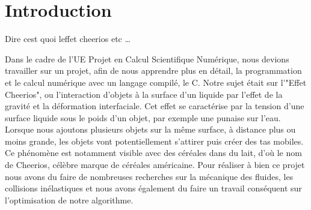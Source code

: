 \documentclass[a4paper, 11pt, oneside]{article} %
\begin{document}
 

\newpage
\section*{Introduction}
    Dire cest quoi leffet cheerios etc \ldots

    Dans le cadre de l'UE Projet en Calcul Scientifique Numérique, nous devions travailler sur un projet, afin de nous apprendre plus en détail, la programmation et le calcul numérique avec un langage compilé, le C. Notre sujet était sur l'"Effet Cheerios", ou l'interaction d'objets à la surface d'un liquide par l'effet de la gravité et la déformation interfaciale. Cet effet se caractérise par la tension d'une surface liquide sous le poids d'un objet, par exemple une punaise sur l'eau. Lorsque nous ajoutons plusieurs objets sur la même surface, à distance plus ou moins grande, les objets vont potentiellement s'attirer puis créer des tas mobiles. Ce phénomène est notamment visible avec des céréales dans du lait, d'où le nom de Cheerios, célèbre marque de céréales américaine. Pour réaliser à bien ce projet nous avons du faire de nombreuses recherches sur la mécanique des fluides, les collisions inélastiques et nous avons également du faire un travail conséquent sur l'optimisation de notre algorithme.
\end{document}
